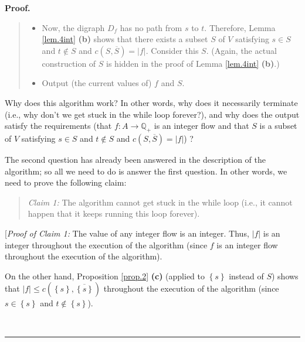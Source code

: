 \documentclass[numbers=enddot,12pt,final,onecolumn,notitlepage]{scrartcl}%
\theoremstyle{definition}
\newenvironment{statement}{\begin{quote}}{\end{quote}}
\newenvironment{proof}[1][Proof]{\noindent\textbf{#1.} }{\ \rule{0.5em}{0.5em}}
\begin{document}
\begin{proof}
\begin{statement}
\begin{itemize}
\begin{itemize}
\item Apply Lemma \ref{lem.4int} \textbf{(a)} to construct an integer flow
$f^{\prime}$ with a larger value than $f$. (Strictly speaking, what we mean is
to apply the construction given in the proof of Lemma \ref{lem.4int}
\textbf{(a)}.)

\item Replace $f$ by $f^{\prime}$. (Thus, the flow $f$ now has a larger value
than it had before.)
\end{itemize}

\textbf{Endwhile}.

\item Now, the digraph $D_{f}$ has no path from $s$ to $t$. Therefore, Lemma
\ref{lem.4int} \textbf{(b)} shows that there exists a subset $S$ of $V$
satisfying $s\in S$ and $t\notin S$ and $c\left(  S,\overline{S}\right)
=\left\vert f\right\vert $. Consider this $S$. (Again, the actual construction
of $S$ is hidden in the proof of Lemma \ref{lem.4int} \textbf{(b)}.)

\item Output (the current values of) $f$ and $S$.
\end{itemize}
\end{statement}

Why does this algorithm work? In other words, why does it necessarily
terminate (i.e., why don't we get stuck in the while loop forever?), and why
does the output satisfy the requirements (that $f:A\rightarrow\mathbb{Q}_{+}$
is an integer flow and that $S$ is a subset of $V$ satisfying $s\in S$ and
$t\notin S$ and $c\left(  S,\overline{S}\right)  =\left\vert f\right\vert $) ?

The second question has already been answered in the description of the
algorithm; so all we need to do is answer the first question. In other words,
we need to prove the following claim:

\begin{statement}
\textit{Claim 1:} The algorithm cannot get stuck in the while loop (i.e., it
cannot happen that it keeps running this loop forever).
\end{statement}

[\textit{Proof of Claim 1:} The value of any integer flow is an integer. Thus,
$\left\vert f\right\vert $ is an integer throughout the execution of the
algorithm (since $f$ is an integer flow throughout the execution of the algorithm).

On the other hand, Proposition \ref{prop.2} \textbf{(c)} (applied to $\left\{
s\right\}  $ instead of $S$) shows that $\left\vert f\right\vert \leq c\left(
\left\{  s\right\}  ,\overline{\left\{  s\right\}  }\right)  $ throughout the
execution of the algorithm (since $s\in\left\{  s\right\}  $ and
$t\notin\left\{  s\right\}  $).


\end{proof}
\end{document}
